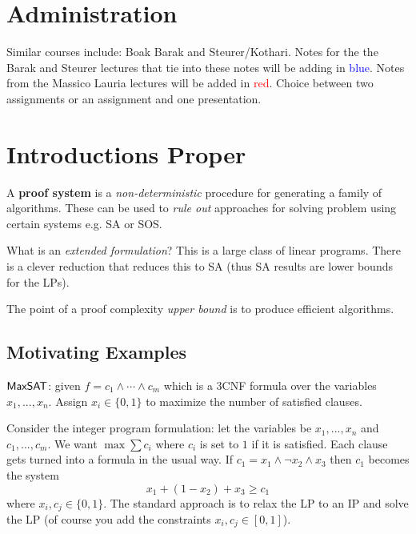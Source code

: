 



\section{Administration}
Similar courses include: Boak Barak and Steurer/Kothari. Notes for the the Barak and Steurer lectures that tie into these notes will be adding in \textcolor{blue}{blue}. Notes from the Massico Lauria lectures will be added in \textcolor{red}{red}. Choice between two assignments or an assignment and one presentation.

\section{Introductions Proper}
\begin{definition}
A \textbf{proof system} is a \emph{non-deterministic} procedure for generating a family of algorithms. These can be used to \emph{rule out} approaches for solving problem using certain systems e.g. SA or SOS. 
\end{definition}

What is an \emph{extended formulation}? This is a large class of linear programs. There is a clever reduction that reduces this to SA (thus SA results are lower bounds for the LPs). 

The point of a proof complexity \emph{upper bound} is to produce efficient algorithms.

\subsection{Motivating Examples} 
\begin{example}
$\mathsf{MaxSAT}$: given $f = c_1 \land \cdots \land c_m$ which is a 3CNF formula over the variables $x_1, ..., x_n$. Assign $x_i \in \{0,1\}$ to maximize the number of satisfied clauses.

Consider the integer program formulation: let the variables be $x_1, ..., x_n$ and $c_1, ..., c_m$. We want $\max \sum c_i$ where $c_i$ is set to $1$ if it is satisfied. Each clause gets turned into a formula in the usual way. If $c_1 = x_1 \land \lnot x_2 \land x_3$ then $c_1$ becomes the system 
\[x_1 + (1-x_2) + x_3 \geq c_1\]
where $x_i, c_j \in \{0,1\}$. The standard approach is to relax the LP to an IP and solve the LP (of course you add the constraints $x_i, c_j \in [0,1]$). 
\end{example}


